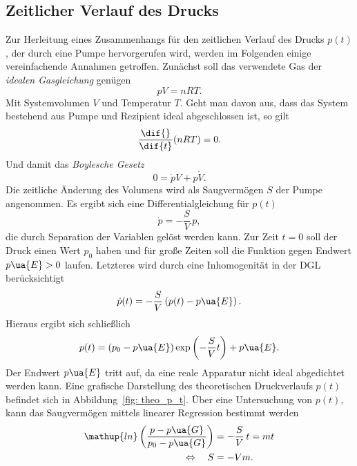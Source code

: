 \subsection{Zeitlicher Verlauf des Drucks}
Zur Herleitung eines Zusammenhangs für den zeitlichen Verlauf des Drucks $p(t)$, der durch eine Pumpe
hervorgerufen wird, werden im Folgenden einige vereinfachende Annahmen getroffen. Zunächst soll das
verwendete Gas der \emph{idealen Gasgleichung} genügen
\begin{equation}
  p V = n R T.
  \label{eq: ideale_gasgleichung}
\end{equation}
Mit Systemvolumen $V$ und Temperatur $T$. Geht man davon aus, dass das System bestehend aus
Pumpe und Rezipient ideal abgeschlossen ist, so gilt
\begin{equation}
  \frac{\dif{}}{\dif{t}}(n R T ) = 0.
\end{equation}
Und damit das \emph{Boylesche Gesetz}
\begin{equation}
  0 = \dot{p}V  + p\dot{V}.
\end{equation}
Die zeitliche Änderung des Volumens wird als Saugvermögen $S$ der Pumpe angenommen. Es ergibt sich eine Differentialgleichung für $p(t)$
\begin{equation}
  \dot{p} = - \frac{S}{V}\, p,
\end{equation}
die durch Separation der Variablen gelöst werden kann. Zur Zeit $t = 0$ soll der Druck einen Wert $p_0$ haben und für große
Zeiten soll die Funktion gegen Endwert $p\ua{E} > 0$ laufen. Letzteres wird durch eine Inhomogenität in der DGL berücksichtigt
\begin{equation}
  \dot{p}(t) = - \frac{S}{V} \left(p(t) - p\ua{E}\right).
\end{equation}
Hieraus ergibt sich schließlich
\begin{equation}
  p(t) = (p_0 - p\ua{E})\exp\left(- \frac{S}{V} t \right) + p\ua{E}.
  \label{eq: evakuierungskurve}
\end{equation}
Der Endwert $p\ua{E}$ tritt auf, da eine reale Apparatur nicht ideal abgedichtet werden kann.
Eine grafische Darstellung des theoretischen Druckverlaufs $p(t)$ befindet sich in Abbildung~\ref{fig: theo_p_t}.
Über eine Untersuchung von $p(t)$, kann das Saugvermögen mittels
linearer Regression bestimmt werden
\begin{align}
  \begin{aligned}
  \mathup{ln}\left(\frac{p - p\ua{G}}{p_0 - p\ua{G}}\right) &= - \frac{S}{V}\,t = m t \\
  \Leftrightarrow \quad S &= -V m.
  \label{eq: saugvermögen_druckverlauf}
\end{aligned}
\end{align}
